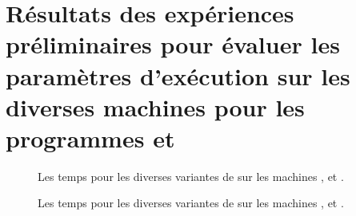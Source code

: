 
\chapter{Résultats des expériences préliminaires pour évaluer les paramètres
d'exécution sur les diverses machines pour les programmes
 et }


\label{wordcount-java.ann}


\begin{figure}

\caption{Les temps pour les diverses variantes de  sur
les machines ,  et .}
\label{preliminaires-wordcount-java.fig}
\end{figure}



\newpage

\label{stockprice-java.ann}


\begin{figure}

\caption{Les temps pour les diverses variantes de  sur
les machines ,  et .}
\label{preliminaires-stockprice-java.fig}
\end{figure}

